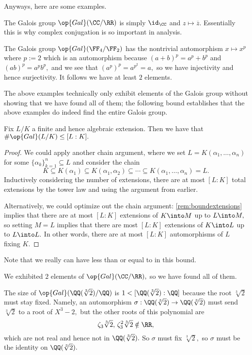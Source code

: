 \documentclass[../notes.tex]{subfiles}
\begin{document}
Anyways, here are some examples.
\begin{example}
	The Galois group $\op{Gal}(\CC/\RR)$ is simply $\id_\CC$ and $z\mapsto\overline z.$ Essentially this is why complex conjugation is so important in analysis.
\end{example}
\begin{example}
	The Galois group $\op{Gal}(\FF_4/\FF_2)$ has the nontrivial automorphism $x\mapsto x^p$ where $p:=2$ which is an automorphism because $(a+b)^p=a^p+b^p$ and $(ab)^p=a^pb^p,$ and we see that $\left(a^p\right)^p=a^{p^2}=a,$ so we have injectivity and hence surjectivity. It follows we have at least $2$ elements.
\end{example}
The above examples technically only exhibit elements of the Galois group without showing that we have found all of them; the following bound establishes that the above examples do indeed find the entire Galois group.
\begin{proposition}
	Fix $L/K$ a finite and hence algebraic extension. Then we have that $\#\op{Gal}(L/K)\le[L:K].$
\end{proposition}
\begin{proof}
	We could apply another chain argument, where we set $L=K(\alpha_1,\ldots,\alpha_n)$ for some $\{\alpha_k\}_{k=1}^n\subseteq L$ and consider the chain
	\[K\subseteq K(\alpha_1)\subseteq K(\alpha_1,\alpha_2)\subseteq\cdots\subseteq K(\alpha_1,\ldots,\alpha_n)=L.\]
	Inductively considering the number of extensions, there are at most $[L:K]$ total extensions by the tower law and using the argument from earlier.

	Alternatively, we could optimize out the chain argument: \autoref{rem:boundextensions} implies that there are at most $[L:K]$ extensions of $K\into M$ up to $L\into M,$ so setting $M=L$ implies that there are most $[L:K]$ extensions of $K\into L$ up to $L\into L.$ In other words, there are at most $[L:K]$ automorphisms of $L$ fixing $K.$
\end{proof}
Note that we really can have less than or equal to in this bound.
\begin{example}
	We exhibited $2$ elements of $\op{Gal}(\CC/\RR),$ so we have found all of them.
\end{example}
\begin{ex}
	The size of $\op{Gal}(\QQ(\sqrt[3]2)/\QQ)$ is $1<[\QQ(\sqrt[3]2):\QQ]$ because the root $\sqrt[3]2$ must stay fixed. Namely, an automorphism $\sigma:\QQ(\sqrt[3]2)\to\QQ(\sqrt[3]2)$ must send $\sqrt[3]2$ to a root of $X^3-2,$ but the other roots of this polynomial are
	\[\zeta_3\sqrt[3]2,\,\zeta_3^2\sqrt[3]2\notin\RR,\]
	which are not real and hence not in $\QQ(\sqrt[3]2).$ So $\sigma$ must fix $\sqrt[3]2,$ so $\sigma$ must be the identity on $\QQ(\sqrt[3]2).$
\end{ex}
\end{document}
